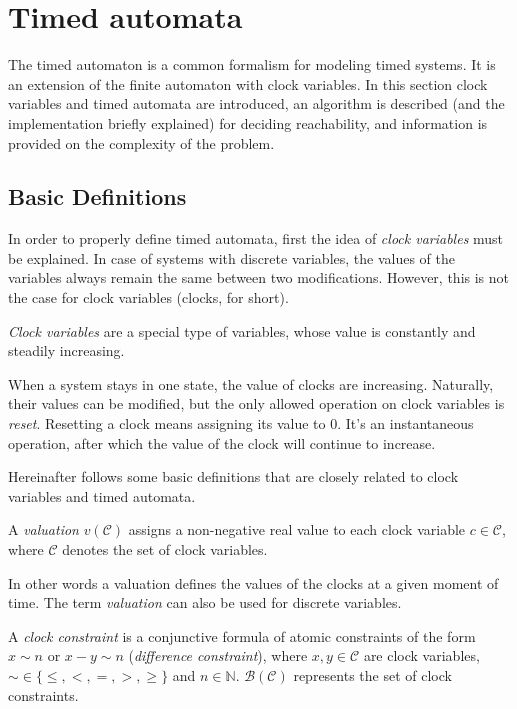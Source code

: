 \section{Timed automata}

The timed automaton is a common formalism for modeling timed systems. It is an extension of the finite automaton with clock variables. In this section clock variables and timed automata are introduced, an algorithm is described (and the implementation briefly explained) for deciding reachability, and information is provided on the complexity of the problem.

\subsection{Basic Definitions}


In order to properly define timed automata, first the idea of \emph{clock variables} must be explained. In case of systems with discrete variables, the values of the variables always remain the same between two modifications. However, this is not the case for clock variables (clocks, for short).

\begin{dfn}
	\emph{Clock variables} are a special type of variables, whose value is constantly and steadily increasing.
\end{dfn}

When a system stays in one state, the value of clocks are increasing. Naturally, their values can be modified, but the only allowed operation on clock variables is \emph{reset}. Resetting a clock means assigning its value to 0. It's an instantaneous operation, after which the value of the clock will continue to increase.

Hereinafter follows some basic definitions that are closely related to clock variables and timed automata. 

\begin{dfn}
	A \emph{valuation} $v(\mathcal{C})$ assigns a non-negative real value
	to each clock variable $c \in \mathcal{C}$, where $\mathcal{C}$ denotes the set of clock
	variables.
\end{dfn}

In other words a valuation defines the values of the clocks at a given moment of time. The term \emph{valuation} can also be used for discrete variables.

\begin{dfn}
	A \emph{clock constraint} is a conjunctive formula of atomic
	constraints of the form $x \sim n$ or $x - y \sim n$ (\emph{difference
		constraint}), where $x,y \in \mathcal{C}$ are clock variables, $\sim \in \{\leq,<,=,>,\geq\}$ and \hbox{$n \in \mathbb{N}$}. $\mathcal{B}(\mathcal{C})$ represents the set of clock
	constraints.
\end{dfn}

